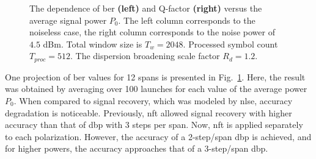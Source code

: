 \begin{figure}[tpb]
\begin{minipage}[h]{0.5\linewidth}
{    }
    \end{minipage}
    \caption{The dependence of \acrshort{ber} \textbf{(left)} and Q-factor \textbf{(right)} versus the average signal power $P_0$. The left column corresponds to the noiseless case, the right column corresponds to the noise power of $4.5$ dBm. Total window size is $T_w=2048$. Processed symbol count $T_{proc} = 512$. The dispersion broadening scale factor $R_d=1.2$.}
    \label{fig:noise_ME}
\end{figure}

One projection of \acrshort{ber} values for 12 spans is presented in Fig.~\ref{fig:noise_ME}. Here, the result was obtained by averaging over 100 launches for each value of the average power $P_0$. When compared to signal recovery, which was modeled by \acrshort{nlse}, accuracy degradation is noticeable. Previously, \acrshort{nft} allowed signal recovery with higher accuracy than that of \acrshort{dbp} with 3 steps per span. Now, \acrshort{nft} is applied separately to each polarization. However, the accuracy of a 2-step/span \acrshort{dbp} is achieved, and for higher powers, the accuracy approaches that of a 3-step/span \acrshort{dbp}.


